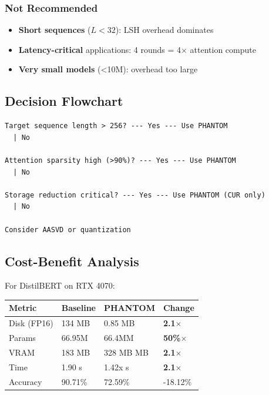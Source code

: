 \subsubsection{Not Recommended}

\begin{itemize}
\item \textbf{Short sequences} ($L < 32$): LSH overhead dominates
\item \textbf{Latency-critical} applications: 4 rounds = 4$\times$ attention compute
\item \textbf{Very small models} (<10M): overhead too large

\end{itemize}
\subsection{Decision Flowchart}

\begin{lstlisting}
Target sequence length > 256? --- Yes --- Use PHANTOM
  | No
   
Attention sparsity high (>90%)? --- Yes --- Use PHANTOM
  | No
   
Storage reduction critical? --- Yes --- Use PHANTOM (CUR only)
  | No
   
Consider AASVD or quantization
\end{lstlisting}

\subsection{Cost-Benefit Analysis}

For DistilBERT on RTX 4070:

\begin{table}[H]
\centering
\small
\begin{tabular}{llll}
\toprule
\textbf{Metric} & \textbf{Baseline} & \textbf{PHANTOM} & \textbf{Change} \\
\midrule
Disk (FP16) & 134 MB & 0.85 MB & \textbf{2.1$\times$} \\
Params & 66.95M & 66.4MM & \textbf{50\%$\times$} \\
VRAM & 183 MB & 328 MB MB & \textbf{2.1$\times$} \\
Time & 1.90 s & 1.42x s & \textbf{2.1$\times$} \\
Accuracy & 90.71\% & 72.59\% & -18.12\% \\
\bottomrule
\end{tabular}
\end{table}

